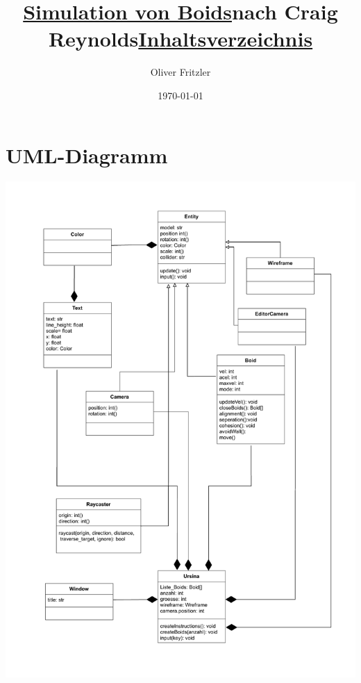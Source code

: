 \documentclass[a4paper, hidelinks, 12pt]{article}
\begin{document}
	
\begin{titlepage}
\title{\Large{\textbf{\underline{Simulation von Boids}}}\linebreak\large\textbf{nach Craig Reynolds}}
\author{Oliver Fritzler}
\date{\today}
\maketitle
\end{titlepage}

\title{\Large{\textbf{\underline{Inhaltsverzeichnis}}}}
\tableofcontents

\section{UML-Diagramm}
\includegraphics[scale=0.75, page=1]{UML/Boids_UML.pdf}
\newpage
\end{document}
